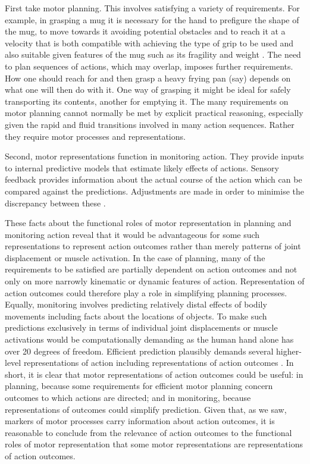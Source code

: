 \documentclass[12pt,\papersize]{extarticle}
\begin{document}
First take motor planning. This involves satisfying a variety of requirements. For example, in grasping a mug it is necessary for the hand to prefigure the shape of the mug, to move towards it avoiding potential obstacles and to reach it at a velocity that is both compatible with achieving the type of grip to be used and also suitable given features of the mug such as its fragility and weight \citep{Jeannerod:1995bb,jeannerod:1998nbo}. The need to plan sequences of actions, which may overlap, imposes further requirements. How one should reach for and then grasp a heavy frying pan (say) depends on what one will then do with it. One way of grasping it might be ideal for safely transporting its contents, another for emptying it. The many requirements on motor planning cannot normally be met by explicit practical reasoning, especially given the rapid and fluid transitions involved in many action sequences. Rather they require motor processes and representations.

Second, motor representations function in monitoring action. They provide inputs to internal predictive models that estimate likely effects of actions. Sensory feedback provides information about the actual course of the action which can be compared against the predictions. Adjustments are made in order to minimise the discrepancy between these \citep{wolpert:1995internal, miall:1996_forward}.

These facts about the functional roles of motor representation in planning and monitoring action reveal that it would be advantageous for some such representations to represent action outcomes rather than merely patterns of joint displacement or muscle activation. In the case of planning, many of the requirements to be satisfied are partially dependent on action outcomes and not only on more narrowly kinematic or dynamic features of action. Representation of action outcomes could therefore play a role in simplifying planning processes.  Equally, monitoring involves predicting relatively distal effects of bodily movements including facts about the locations of objects. To make such predictions exclusively in terms of individual joint displacements or muscle activations would be computationally demanding as the human hand alone has over 20 degrees of freedom. Efficient prediction plausibly demands several higher-level representations of action including representations of action outcomes \citep{arbib:1985_coordinated,mason:2001_hand,santello:2002_patterns}. In short, it is clear that motor representations of action outcomes could be useful: in planning, because some requirements for efficient motor planning concern outcomes to which actions are directed; and in monitoring, because representations of outcomes could simplify prediction. Given that, as we saw, markers of motor processes carry information about action outcomes, it is reasonable to conclude from the relevance of action outcomes to the functional roles of motor representation that some motor representations are representations of action outcomes.
\end{document}
